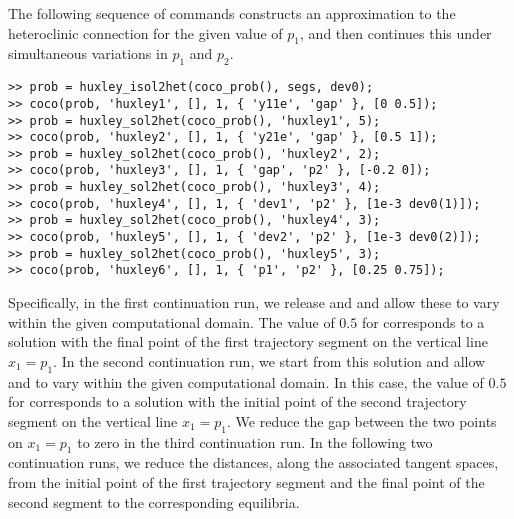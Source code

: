 The following sequence of commands constructs an approximation to the heteroclinic connection for the given value of $p_1$, and then continues this under simultaneous variations in $p_1$ and $p_2$.
\begin{lstlisting}[language=coco-highlight]
>> prob = huxley_isol2het(coco_prob(), segs, dev0);
>> coco(prob, 'huxley1', [], 1, { 'y11e', 'gap' }, [0 0.5]);
>> prob = huxley_sol2het(coco_prob(), 'huxley1', 5);
>> coco(prob, 'huxley2', [], 1, { 'y21e', 'gap' }, [0.5 1]);
>> prob = huxley_sol2het(coco_prob(), 'huxley2', 2);
>> coco(prob, 'huxley3', [], 1, { 'gap', 'p2' }, [-0.2 0]);
>> prob = huxley_sol2het(coco_prob(), 'huxley3', 4);
>> coco(prob, 'huxley4', [], 1, { 'dev1', 'p2' }, [1e-3 dev0(1)]);
>> prob = huxley_sol2het(coco_prob(), 'huxley4', 3);
>> coco(prob, 'huxley5', [], 1, { 'dev2', 'p2' }, [1e-3 dev0(2)]);
>> prob = huxley_sol2het(coco_prob(), 'huxley5', 3);
>> coco(prob, 'huxley6', [], 1, { 'p1', 'p2' }, [0.25 0.75]);
\end{lstlisting}
Specifically, in the first continuation run, we release  and  and allow these to vary within the given computational domain. The value of $0.5$ for  corresponds to a solution with the final point of the first trajectory segment on the vertical line $x_1=p_1$. In the second continuation run, we start from this solution and allow  and  to vary within the given computational domain. In this case, the value of $0.5$ for  corresponds to a solution with the initial point of the second trajectory segment on the vertical line $x_1=p_1$. We reduce the gap between the two points on $x_1=p_1$ to zero in the third continuation run. In the following two continuation runs, we reduce the distances, along the associated tangent spaces, from the initial point of the first trajectory segment and the final point of the second segment to the corresponding equilibria.
\newline
